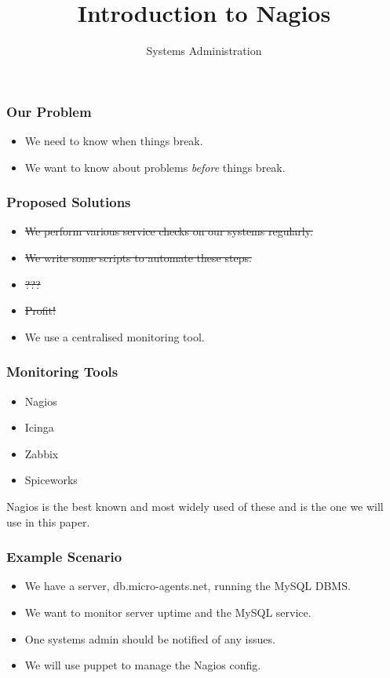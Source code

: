 \documentclass[10pt]{beamer}
\title{Introduction to Nagios}
\author[IN719]{Systems Administration}
\institute[Otago Polytechnic]{
  Otago Polytechnic \\
  Dunedin, New Zealand \\
}
\date{}
\begin{document}
\begin{frame}[plain]
  \titlepage
\end{frame}

\begin{frame}
  \frametitle{Our Problem}
  
\begin{itemize}
\item We need to know when things break. 
\item We want to know about problems \emph{before} things break.
\end{itemize}
\end{frame}


\begin{frame}
  \frametitle{Proposed Solutions}
  
\begin{itemize}
\item \sout{We perform various service checks on our systems regularly.} 
\item \sout{We write some scripts to automate these steps.}
\item \sout{???}
\item \sout{Profit!}
\item We use a centralised monitoring tool.
\end{itemize}
\end{frame}


\begin{frame}
  \frametitle{Monitoring Tools}
  
\begin{itemize}
\item Nagios
\item Icinga
\item Zabbix
\item Spiceworks
\end{itemize}

Nagios is the best known and most widely used of these and is the one we will use in this paper.
\end{frame}


\begin{frame}
  \frametitle{Example Scenario}
  
\begin{itemize}
\item We have a server, db.micro-agents.net, running the MySQL DBMS.
\item We want to monitor server uptime and the MySQL service.
\item One systems admin should be notified of any issues.
\item We will use puppet to manage the Nagios config.
\end{itemize}

\end{frame}
\end{document}

